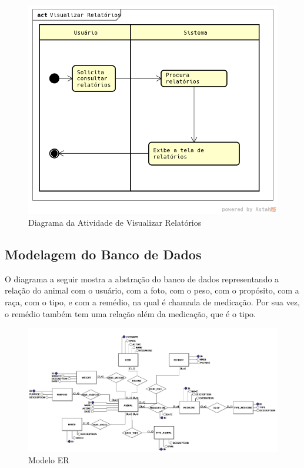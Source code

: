\documentclass[12pt]{article}
\begin{document}
	\begin{figure}[!h]
		\begin{center}
			\caption{Diagrama da Atividade de Visualizar Relatórios}
			\includegraphics[width=6in]{img/atividaderelatorios.png}

		\end{center}
	\end{figure}

	\newpage

	\subsection{Modelagem do Banco de Dados}

	O diagrama a seguir mostra a abstração do banco de dados representando a relação do animal com o usuário, com a foto, com o peso, com o propósito, com a raça, com o tipo, e com a remédio, na qual é chamada de medicação. Por sua vez, o remédio também tem uma relação além da medicação, que é o tipo.  

	\begin{figure}[!h]
		\begin{center}
			\caption{Modelo ER}
			\includegraphics[width=6in]{img/erdoboi.jpeg}


		\end{center}
	\end{figure}
\end{document}

